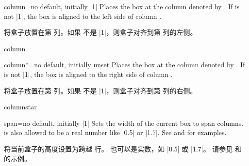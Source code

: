 \begin{posterlocTcbKey}[][doc new=2017-07-03]{column}{=}{no default, initially |1|}
Places the box at the column denoted by . If 
is not |1|, the box is aligned to the left side of column .

将盒子放置在第  列。如果  不是 |1|，则盒子对齐到第  列的左侧。
\begin{exdispExample}{column}
\begin{tcbposter}[
  poster = {showframe,height=2.5cm,spacing=2mm,rows=2},
  boxes  = {beamer,colframe=blue!50!black,colback=blue!50,colupper=yellow!50},
]
\end{tcbposter}
\end{exdispExample}
\end{posterlocTcbKey}

\enlargethispage*{1cm}
\begin{posterlocTcbKey}[][doc new=2017-07-03]{column*}{=}{no default, initially unset}
Places the box at the column denoted by . If 
is not |1|, the box is aligned to the right side of column .

将盒子放置在第  列。如果  不是 |1|，则盒子对齐到第  列的右侧。
\begin{exdispExample}{columnstar}
\begin{tcbposter}[
  poster = {showframe,height=2.5cm,spacing=2mm,rows=2},
  boxes  = {beamer,colframe=blue!50!black,colback=blue!50,colupper=yellow!50},
]
\end{tcbposter}
\end{exdispExample}
\end{posterlocTcbKey}


%
\begin{posterlocTcbKey}[][doc new=2017-07-03]{span}{=}{no default, initially |1|}
Sets the width of the current box to span  columns.
 is also allowed to be a real number like |0.5| or |1.7|.
See  and 
for examples.

将当前盒子的高度设置为跨越  行。
 也可以是实数，如 |0.5| 或 |1.7|。
请参见  和  的示例。
\end{posterlocTcbKey}

